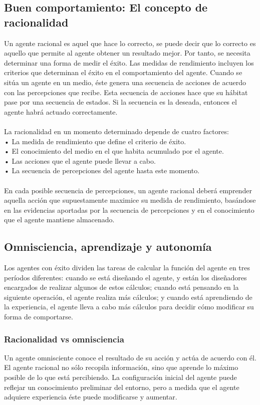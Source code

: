 \documentclass[12pt,a4paper]{report}
\begin{document}
\subsection*{Buen comportamiento: El concepto de racionalidad}
Un agente racional es aquel que hace lo correcto, se puede decir que lo correcto es aquello que permite al agente obtener un resultado mejor. Por tanto, se necesita determinar una forma de medir el éxito. Las medidas de rendimiento incluyen los criterios que determinan el éxito en el comportamiento del agente. Cuando se sitúa un agente en un medio, éste genera una secuencia de acciones de acuerdo con las percepciones que recibe. Esta secuencia de acciones hace que su hábitat pase por una secuencia de estados. Si la secuencia es la deseada, entonces el agente habrá actuado correctamente.\\\\ La racionalidad en un momento determinado depende de cuatro factores:\\• La medida de rendimiento que define el criterio de éxito.\\• El conocimiento del medio en el que habita acumulado por el agente.\\• Las acciones que el agente puede llevar a cabo.\\• La secuencia de percepciones del agente hasta este momento.\\\\En cada posible secuencia de percepciones, un agente racional deberá emprender aquella acción que supuestamente maximice su medida de rendimiento, basándose en las evidencias aportadas por la secuencia de percepciones y en el conocimiento que el agente
mantiene almacenado.
\subsection*{Omnisciencia, aprendizaje y autonomía}
Los agentes con éxito dividen las tareas de calcular la función del agente en tres períodos diferentes: cuando se está diseñando el agente, y están los diseñadores encargados de realizar algunos de estos cálculos; cuando está pensando en la siguiente operación, el agente realiza más cálculos; y cuando está aprendiendo de la experiencia, el agente lleva a cabo más cálculos para decidir cómo modificar su forma de comportarse.
\subsubsection*{Racionalidad vs omnisciencia}
Un agente omnisciente conoce el resultado de su acción y actúa de acuerdo con él. El agente racional no sólo recopila información, sino que aprende lo máximo posible de lo que está percibiendo. La configuración inicial del agente puede reflejar un conocimiento preliminar del entorno, pero a medida que el agente adquiere experiencia éste puede modificarse y aumentar.
\end{document}
